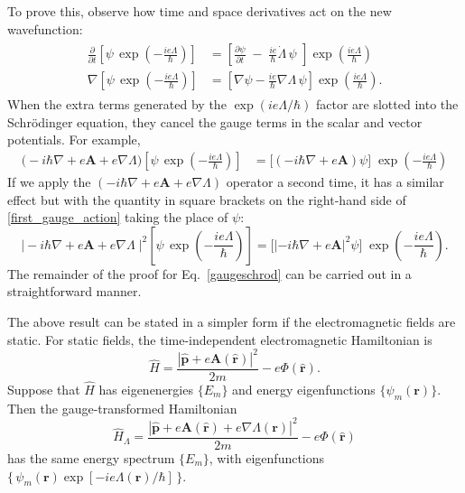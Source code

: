 \documentclass[pra,12pt]{revtex4}
\begin{document}
To prove this, observe how time and space derivatives act on the new
wavefunction:
\begin{align}
  \begin{aligned}
    \frac{\partial}{\partial t} \left[\psi \, \exp\left(-\frac{ie\Lambda}{\hbar}\right)\right] &=
    \left[\frac{\partial\psi}{\partial t} \;-\; \frac{ie}{\hbar} \dot{\Lambda}\, \psi
      \,\, \right] \exp\left(\frac{ie\Lambda}{\hbar}\right)\\
    \nabla \left[\psi \, \exp\left(-\frac{ie\Lambda}{\hbar}\right)\right] &=
    \left[\nabla \psi - \frac{ie}{\hbar} \nabla \Lambda \,\psi \right] \exp\left(\frac{ie\Lambda}{\hbar}\right).
  \end{aligned}
\end{align}
When the extra terms generated by the $\exp(ie\Lambda/\hbar)$ factor
are slotted into the Schr\"odinger equation, they cancel the gauge
terms in the scalar and vector potentials.  For example,
\begin{align}
  \Big(-i\hbar\nabla + e\mathbf{A} + e\nabla\Lambda\Big)
  \left[\psi \, \exp\left(-\frac{ie\Lambda}{\hbar}\right)\right] &=
  \Big[\left(-i\hbar\nabla + e\mathbf{A}\right)\psi\Big]\;
  \exp\left(-\frac{ie\Lambda}{\hbar}\right)
  \label{first_gauge_action}
\end{align}
If we apply the $(-i\hbar\nabla + e\mathbf{A} + e\nabla\Lambda)$
operator a second time, it has a similar effect but with the quantity
in square brackets on the right-hand side of
\eqref{first_gauge_action} taking the place of $\psi$:
\begin{equation}
  \Big|-i\hbar\nabla + e\mathbf{A} + e\nabla\Lambda\;\Big|^2
  \left[\psi \, \exp\left(-\frac{ie\Lambda}{\hbar}\right)\right]  
  =   \Big[\left|-i\hbar\nabla + e\mathbf{A}\right|^2\psi\Big]\;
  \exp\left(-\frac{ie\Lambda}{\hbar}\right).
\end{equation}
The remainder of the proof for Eq.~\eqref{gaugeschrod} can be carried
out in a straightforward manner.

The above result can be stated in a simpler form if the
electromagnetic fields are static.  For static fields, the
time-independent electromagnetic Hamiltonian is
\begin{equation}
  \hat{H} = \frac{|\hat{\mathbf{p}}+e\mathbf{A}(\hat{\mathbf{r}})|^2}{2m}
  - e\Phi(\hat{\mathbf{r}}).
\end{equation}
Suppose that $\hat{H}$ has eigenenergies $\{E_m \}$ and energy
eigenfunctions $\{\psi_m(\mathbf{r})\}$.  Then the gauge-transformed
Hamiltonian
\begin{equation}
  \hat{H}_\Lambda = \frac{|\hat{\mathbf{p}}+e\mathbf{A}(\hat{\mathbf{r}}) + e\nabla\Lambda(\mathbf{r})|^2}{2m}
  - e\Phi(\hat{\mathbf{r}})
\end{equation}
has the same energy spectrum $\{E_m\}$, with eigenfunctions
$\{\,\psi_m(\mathbf{r}) \exp[-ie\Lambda(\mathbf{r})/\hbar]\,\}$.
\end{document}
